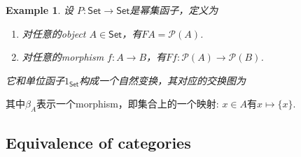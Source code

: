 \documentclass{article}
\newtheorem{example}[theorem]{Example}
\newcommand{\Set}{\textsf{Set}\xspace}
\newcommand*{\xfunc}[4]{{#2}\colon{#3}{#1}{#4}}
\newcommand*{\func}[3]{\xfunc{\to}{#1}{#2}{#3}}
\begin{document}
\begin{example}
\rm 设 $P \colon \Set \rightarrow \Set $是幂集函子，定义为
\begin{enumerate}
	\item 对任意的object $A \in \Set$，有$FA = \mathcal{P}(A)$.
	\item 对任意的morphism $\func{f}{A}{B}$，有$\func{Ff}{\mathcal{P}(A)}{\mathcal{P}(B)}$. 
\end{enumerate}
它和单位函子$1_{\Set}$构成一个自然变换，其对应的交换图为
\begin{center}
\end{center}
\end{example}
其中$\beta_A$表示一个morphism，即集合上的一个映射: $x \in A$有$x \mapsto \{x\}$.

\newpage
\subsection{Equivalence of categories}
\end{document}
